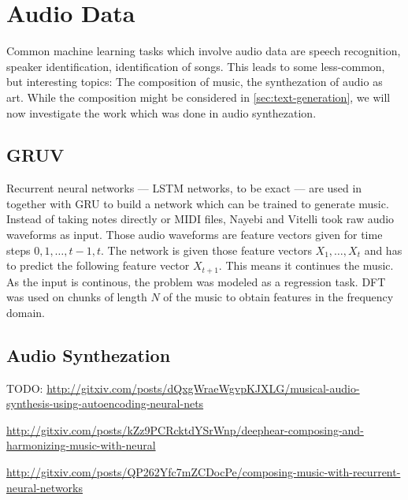 
\section{Audio Data}
\label{sec:music}

Common machine learning tasks which involve audio data are speech recognition,
speaker identification, identification of songs. This leads to some
less-common, but interesting topics: The composition of music, the synthezation
of audio as art. While the composition might be considered in
\cref{sec:text-generation}, we will now investigate the work which was done in
audio synthezation.

\subsection{GRUV}

Recurrent neural networks --- \gls{LSTM} networks, to be exact --- are used
in~\cite{nayebigruv} together with \gls{GRU} to build a network which can be
trained to generate music. Instead of taking notes directly or MIDI files,
Nayebi and Vitelli took raw audio waveforms as input. Those audio waveforms are
feature vectors given for time steps $0, 1, \dots, t-1, t$. The network is
given those feature vectors $X_1, \dots, X_t$ and has to predict the following
feature vector $X_{t+1}$. This means it continues the music. As the input is
continous, the problem was modeled as a regression task. \Gls{DFT} was used on
chunks of length $N$ of the music to obtain features in the frequency domain.


\subsection{Audio Synthezation}
TODO: \href{http://gitxiv.com/posts/dQxgWraeWgvpKJXLG/musical-audio-synthesis-using-autoencoding-neural-nets}{http://gitxiv.com/posts/dQxgWraeWgvpKJXLG/musical-audio-synthesis-using-autoencoding-neural-nets}

\href{http://gitxiv.com/posts/kZz9PCRcktdYSrWnp/deephear-composing-and-harmonizing-music-with-neural}{http://gitxiv.com/posts/kZz9PCRcktdYSrWnp/deephear-composing-and-harmonizing-music-with-neural}

\href{http://gitxiv.com/posts/QP262Yfc7mZCDocPe/composing-music-with-recurrent-neural-networks}{http://gitxiv.com/posts/QP262Yfc7mZCDocPe/composing-music-with-recurrent-neural-networks}

